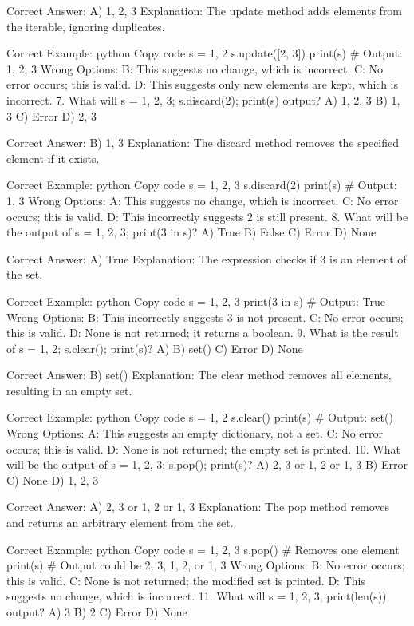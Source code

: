 Correct Answer: A) {1, 2, 3}
Explanation: The update method adds elements from the iterable, ignoring duplicates.

Correct Example:
python
Copy code
s = {1, 2}
s.update([2, 3])
print(s)  # Output: {1, 2, 3}
Wrong Options:
B: This suggests no change, which is incorrect.
C: No error occurs; this is valid.
D: This suggests only new elements are kept, which is incorrect.
7. What will s = {1, 2, 3}; s.discard(2); print(s) output?
A) {1, 2, 3}
B) {1, 3}
C) Error
D) {2, 3}

Correct Answer: B) {1, 3}
Explanation: The discard method removes the specified element if it exists.

Correct Example:
python
Copy code
s = {1, 2, 3}
s.discard(2)
print(s)  # Output: {1, 3}
Wrong Options:
A: This suggests no change, which is incorrect.
C: No error occurs; this is valid.
D: This incorrectly suggests 2 is still present.
8. What will be the output of s = {1, 2, 3}; print(3 in s)?
A) True
B) False
C) Error
D) None

Correct Answer: A) True
Explanation: The expression checks if 3 is an element of the set.

Correct Example:
python
Copy code
s = {1, 2, 3}
print(3 in s)  # Output: True
Wrong Options:
B: This incorrectly suggests 3 is not present.
C: No error occurs; this is valid.
D: None is not returned; it returns a boolean.
9. What is the result of s = {1, 2}; s.clear(); print(s)?
A) {}
B) set()
C) Error
D) None

Correct Answer: B) set()
Explanation: The clear method removes all elements, resulting in an empty set.

Correct Example:
python
Copy code
s = {1, 2}
s.clear()
print(s)  # Output: set()
Wrong Options:
A: This suggests an empty dictionary, not a set.
C: No error occurs; this is valid.
D: None is not returned; the empty set is printed.
10. What will be the output of s = {1, 2, 3}; s.pop(); print(s)?
A) {2, 3} or {1, 2} or {1, 3}
B) Error
C) None
D) {1, 2, 3}

Correct Answer: A) {2, 3} or {1, 2} or {1, 3}
Explanation: The pop method removes and returns an arbitrary element from the set.

Correct Example:
python
Copy code
s = {1, 2, 3}
s.pop()  # Removes one element
print(s)  # Output could be {2, 3}, {1, 2}, or {1, 3}
Wrong Options:
B: No error occurs; this is valid.
C: None is not returned; the modified set is printed.
D: This suggests no change, which is incorrect.
11. What will s = {1, 2, 3}; print(len(s)) output?
A) 3
B) 2
C) Error
D) None


